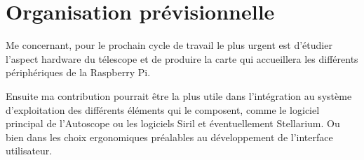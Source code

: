 \chapter{Organisation prévisionnelle}
\label{chapter4}

Me concernant, pour le prochain cycle de travail le plus urgent est d'étudier l'aspect hardware du télescope et de produire la carte qui accueillera les différents périphériques de la Raspberry Pi.

\vspace{1cm}

Ensuite ma contribution pourrait être la plus utile dans l'intégration au système d'exploitation des différents éléments qui le composent, comme le logiciel principal de l'Autoscope ou les logiciels Siril et éventuellement Stellarium. Ou bien dans les choix ergonomiques préalables au développement de l'interface utilisateur.
